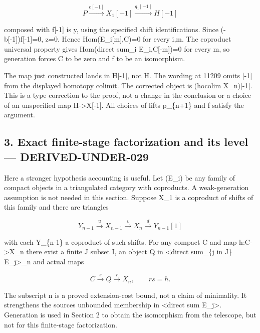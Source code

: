 \[
 P\xrightarrow{e[-1]}X_1[-1]\xrightarrow{q_1[-1]}H[-1]
\]

composed with f[-1]\allowbreak{} is y,\allowbreak{} using the specified shift identifications. Since (-b[-1]\allowbreak{})\allowbreak{}f[-1]\allowbreak{}\allowbreak{}=0,\allowbreak{} z\allowbreak{}=0. Hence Hom(E\_\allowbreak{}i[m]\allowbreak{},\allowbreak{}C)\allowbreak{}\allowbreak{}=0 for every i,\allowbreak{}m. The coproduct universal property gives Hom(direct sum\_\allowbreak{}i E\_\allowbreak{}i,\allowbreak{}C[-m]\allowbreak{})\allowbreak{}\allowbreak{}=0 for every m,\allowbreak{} so generation forces C to be zero and f to be an isomorphism.

The map just constructed lands in H[-1]\allowbreak{},\allowbreak{} not H. The wording at 11209 omits [-1]\allowbreak{} from the displayed homotopy colimit. The corrected object is (hocolim X\_\allowbreak{}n)\allowbreak{}[-1]\allowbreak{}. This is a type correction to the proof,\allowbreak{} not a change in the conclusion or a choice of an unspecified map H\allowbreak{}->X[-1]\allowbreak{}. All choices of lifts p\_\allowbreak{}\{n\allowbreak{}+1\} and f satisfy the argument.

\subsection{3. Exact finite-stage factorization and its level --- DERIVED-UNDER-029}\label{proofs-11121-11450-exact-finite-stage-factorization-and-its-level-derived-under-029}

Here a stronger hypothesis accounting is useful. Let (E\_\allowbreak{}i)\allowbreak{} be any family of compact objects in a triangulated category with coproducts. A weak-generation assumption is not needed in this section. Suppose X\_\allowbreak{}1 is a coproduct of shifts of this family and there are triangles

\[
 Y_{n-1}\xrightarrow u X_{n-1}\xrightarrow v X_n
        \xrightarrow d Y_{n-1}[1]
\]

with each Y\_\allowbreak{}\{n-1\} a coproduct of such shifts. For any compact C and map h:\allowbreak{}C\allowbreak{}->X\_\allowbreak{}n there exist a finite J subset I,\allowbreak{} an object Q in \textless direct sum\_\allowbreak{}\{j in J\} E\_\allowbreak{}j>\_\allowbreak{}n and actual maps

\[
 C\xrightarrow s Q\xrightarrow r X_n,\qquad rs=h.
\]

The subscript n is a proved extension-cost bound,\allowbreak{} not a claim of minimality. It strengthens the source\textquotesingle s unbounded membership in \textless direct sum E\_\allowbreak{}j>. Generation is used in Section 2 to obtain the isomorphism from the telescope,\allowbreak{} but not for this finite-stage factorization.

